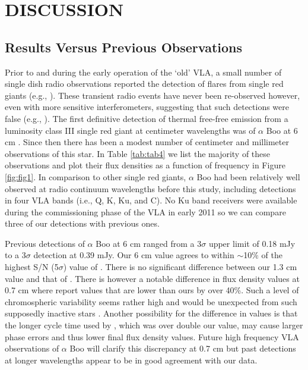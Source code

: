 \documentclass[iop]{emulateapj}
\begin{document}
\section{DISCUSSION} \label{disc:disc0}
\subsection{Results Versus Previous Observations} \label{disc1}
Prior to and during the early operation of the `old' VLA, a small number of single dish radio observations reported the detection of flares from single red giants (e.g., \citealt{1981ApJ...245L..71B}). These transient radio events have never been re-observed however, even with more sensitive interferometers, suggesting that such detections were false (e.g., \citealt{1992MNRAS.254....1B}). The first definitive detection of thermal free-free emission from a luminosity class III single red giant at centimeter wavelengths was of $\alpha$ Boo at 6 cm \citep{1983ApJ...274L..77D,1986AJ.....91..602D}. Since then there has been a modest number of centimeter and millimeter observations of this star. In Table \ref{tab:tab4} we list the majority of these observations and plot their flux densities as a function of frequency in Figure \ref{fig:fig1}. In comparison to other single red giants, $\alpha$ Boo had been relatively well observed at radio continuum wavelengths before this study, including detections in four VLA bands (i.e., Q, K, Ku, and C). No Ku band receivers were available during the commissioning phase of the VLA in early 2011 so we can compare three of our detections with previous ones. 

Previous detections of $\alpha$ Boo at 6 cm ranged from a 3$\sigma$ upper limit of 0.18 mJy to a 3$\sigma$ detection at 0.39 mJy. Our 6 cm value agrees to within $\sim$10$\%$ of the highest S/N (5$\sigma$) value of \cite{1986AJ.....91..602D}. There is no significant difference between our 1.3 cm value and that of \cite{2011AA...533A.107D}. There is however a notable difference in flux density values at 0.7 cm  where \cite{2011AA...533A.107D} report values that are lower than ours by over 40\%. Such a level of chromospheric variability seems rather high and would be unexpected from such supposedly inactive stars \citep{2013MNRAS.428.2064H}. Another possibility for the difference in values is that the longer cycle time used by \cite{2011AA...533A.107D}, which was over double our value, may cause larger phase errors and thus lower final flux density values. Future high frequency VLA observations of $\alpha$ Boo will clarify this discrepancy at 0.7 cm but past detections at longer wavelengths appear to be in good agreement with our data.
\end{document}
